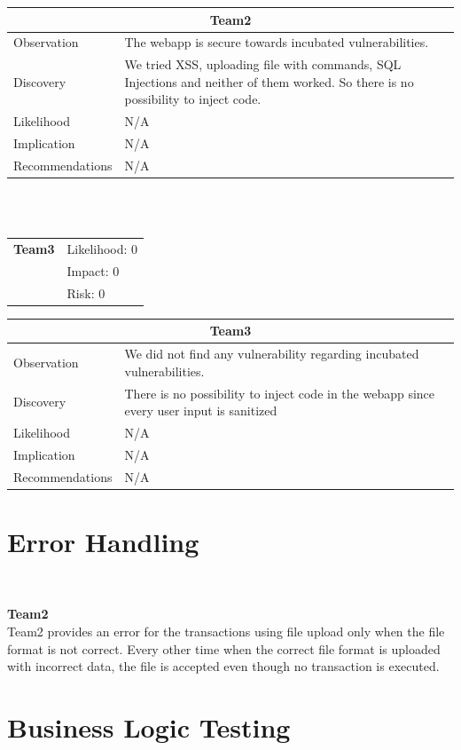 \documentclass[headsepline,footsepline,footinclude=false,oneside,fontsize=11pt,paper=a4,listof=totoc,bibliography=totoc]{scrbook} %
\begin{document}
\begin{tabular}{ l|p{11cm}  }
	\hline
	\multicolumn{2}{c}{\textbf{Team2}} \\
	\hline
	Observation   &The webapp is secure towards incubated vulnerabilities.\\
	Discovery  & We tried XSS, uploading file with commands, SQL Injections and neither of them worked. So there is no possibility to inject code.\\
	Likelihood & N/A \\
	Implication    & N/A\\
	Recommendations & N/A \\ 
	\hline
\end{tabular}
\\
\vspace{0.5cm}
\\
\begin{tabular}{cR{12cm}}
	\textbf{Team3} & Likelihood: 0\\& Impact: 0\\& Risk: 0
\end{tabular}

\begin{tabular}{ l|p{11cm}  }
	\hline
	\multicolumn{2}{c}{\textbf{Team3}} \\
	\hline
	Observation   & We did not find any vulnerability regarding incubated vulnerabilities.\\
	Discovery  & There is no possibility to inject code in the webapp since every user input is sanitized \\
	Likelihood & N/A \\
	Implication    & N/A \\
	Recommendations & N/A \\ 
	\hline
\end{tabular}
\pagebreak
\section{Error Handling}\

\textbf{Team2}\\

Team2 provides an error for the transactions using file upload only when the file format is not correct. Every other time when the correct file format is uploaded with incorrect data, the file is accepted even though no transaction is executed.\\
 
 \pagebreak
\section{Business Logic Testing}\
\end{document}
